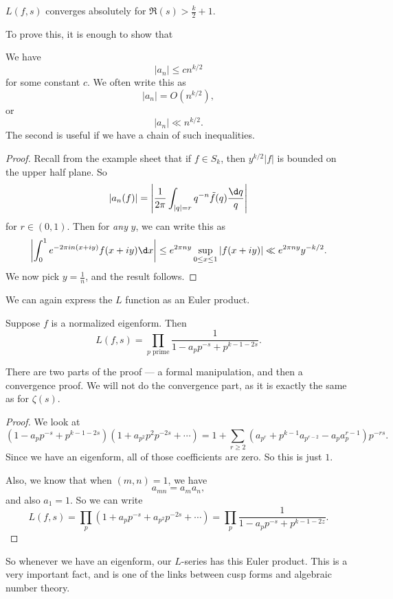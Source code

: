 \documentclass[a4paper]{article}
\begin{document}
\begin{prop}
  $L(f, s)$ converges absolutely for $\Re(s) > \frac{k}{2} + 1$.
\end{prop}

To prove this, it is enough to show that
\begin{prop}
  We have
  \[
    |a_n| \leq c n^{k/2}
  \]
  for some constant $c$. We often write this as
  \[
    |a_n| = O(n^{k/2}),
  \]
  or
  \[
    |a_n| \ll n^{k/2}.
  \]
  The second is useful if we have a chain of such inequalities.
\end{prop}

\begin{proof}
  Recall from the example sheet that if $f \in S_k$, then $y^{k/2} |f|$ is bounded on the upper half plane. So
  \[
    |a_n(f)| = \left|\frac{1}{2\pi} \int_{|q| = r} q^{-n} \tilde{f}(q) \frac{\d q}{q}\right|
  \]
  for $r \in (0, 1)$. Then for \emph{any} $y$, we can write this as
  \[
    \left|\int_0^1 e^{-2\pi i n(x + iy)} f(x + iy) \d x\right| \leq e^{2\pi n y}\sup_{0 \leq x \leq 1} |f(x + iy)| \ll e^{2\pi n y} y^{-k/2}.
  \]
  We now pick $y = \frac{1}{n}$, and the result follows.
\end{proof}

We can again express the $L$ function as an Euler product.

\begin{prop}
  Suppose $f$ is a normalized eigenform. Then
  \[
    L(f, s) = \prod_{p\text{ prime}} \frac{1}{1 - a_p p^{-s} + p^{k - 1 - 2s}}.
  \]
\end{prop}

There are two parts of the proof --- a formal manipulation, and then a convergence proof. We will not do the convergence part, as it is exactly the same as for $\zeta(s)$.
\begin{proof}
  We look at
  \[
    (1 - a_p p^{-s} + p^{k - 1 - 2s}) (1 + a_{p^2} p^2 p^{-2s} + \cdots) = 1 + \sum_{r \geq 2} (a_{p^r} + p^{k - 1} a_{p^{r - 2}} - a_p a_p^{r - 1}) p^{-rs}.
  \]
  Since we have an eigenform, all of those coefficients are zero. So this is just $1$.

  Also, we know that when $(m, n) = 1$, we have
  \[
    a_{mn} = a_m a_n,
  \]
  and also $a_1 = 1$. So we can write
  \[
    L(f, s) = \prod_p (1 + a_p p^{-s} + a_{p^2} p^{-2s} + \cdots) = \prod_p \frac{1}{1 - a_p p^{-s} + p^{k - 1 - 2z}}.
  \]
\end{proof}
So whenever we have an eigenform, our $L$-series has this Euler product. This is a very important fact, and is one of the links between cusp forms and algebraic number theory.
\end{document}
